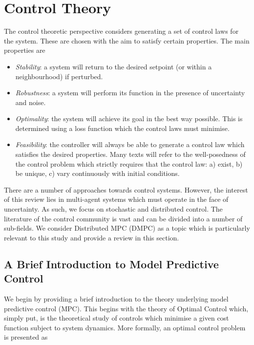 \documentclass[.../main.tex]{subfiles}
\begin{document}
\section{Control Theory} \label{sec::Control_Theory}

The control theoretic perspective considers generating a set of control laws for the system. These
are chosen with the aim to satisfy certain properties. The main properties are

\begin{itemize}
    \item {\em Stability}: a system will return to the desired setpoint (or within a neighbourhood) if
    perturbed.

    \item {\em Robustness}: a system will perform its function in the presence of uncertainty and
    noise.

    \item {\em Optimality}: the system will achieve its goal in the best way possible. This is
    determined using a loss function which the control laws must minimise.

    \item {\em Feasibility}: the controller will always be able to generate a control law which
    satisfies the desired properties. Many texts will refer to the well-posedness of the control
    problem which strictly requires that the control law: a) exist, b) be unique, c) vary
    continuously with initial conditions.
\end{itemize}

There are a number of approaches towards control systems. However, the interest of this review lies
in multi-agent systems which must operate in the face of uncertainty. As such, we focus on
stochastic and distributed control. The literature of the control community is vast and can be
divided into a number of sub-fields. We consider Distributed MPC (DMPC) as
a topic which is particularly relevant to this study and provide a review in this section. 


\subsection{A Brief Introduction to Model Predictive Control} %
\label{sub:a_brief_introduction_to_model_predictive_control}

We begin by providing a brief introduction to the theory underlying model predictive control (MPC).
This begins with the theory of Optimal Control which, simply put, is the theoretical study of
controls which minimise a given cost function subject to system dynamics. More formally, an optimal
control problem is presented as
\end{document}
